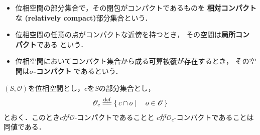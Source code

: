 	\begin{screen}
		\begin{dfn}\mbox{}
			\begin{itemize}
				\item 位相空間の部分集合で，その閉包がコンパクトであるものを
					{\bf 相対コンパクト}な
					{\bf (relatively compact)}部分集合という．
				
				\item 位相空間の任意の点がコンパクトな近傍を持つとき，
					その空間は{\bf 局所コンパクト}である
					という．
					
				\item 位相空間においてコンパクト集合から成る可算被覆が存在するとき，
					その空間は{\bf $\sigma$-コンパクト}
					であるという．
			\end{itemize}
		\end{dfn}
	\end{screen}
	
	\begin{screen}
		\begin{thm}[部分空間におけるコンパクト性]
		\label{thm:compactness_in_subspace}
			$(S,\mathscr{O})$を位相空間とし，$c$を$S$の部分集合とし，
			\begin{align}
				\mathscr{O}_{c} \defeq \Set{c \cap o}{o \in \mathscr{O}}
			\end{align}
			とおく．このとき$c$が$\mathscr{O}$-コンパクトであることと
			$c$が$\mathscr{O}_{c}$-コンパクトであることは同値である．
		\end{thm}
	\end{screen}
	
